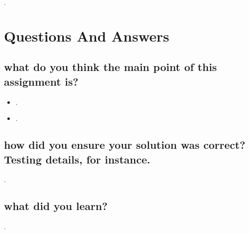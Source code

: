 \documentclass[letterpaper,10pt,titlepage]{article}
\begin{document}
.

\section{Questions And Answers}

\subsection{what do you think the main point of this assignment is?}

\begin{itemize}
\item .
\item .
\end{itemize}

\subsection{how did you ensure your solution was correct? Testing details, for instance.}

.

\subsection{what did you learn?}

.
\end{document}

